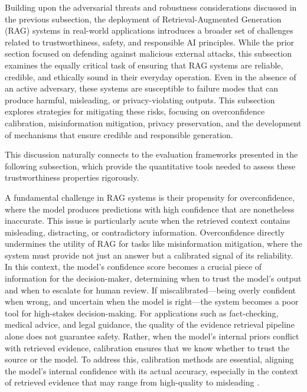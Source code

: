 \documentclass[11pt]{article}
\begin{document}
Building upon the adversarial threats and robustness considerations discussed in the previous subsection, the deployment of Retrieval-Augmented Generation (RAG) systems in real-world applications introduces a broader set of challenges related to trustworthiness, safety, and responsible AI principles. While the prior section focused on defending against malicious external attacks, this subsection examines the equally critical task of ensuring that RAG systems are reliable, credible, and ethically sound in their everyday operation. Even in the absence of an active adversary, these systems are susceptible to failure modes that can produce harmful, misleading, or privacy-violating outputs. This subsection explores strategies for mitigating these risks, focusing on overconfidence calibration, misinformation mitigation, privacy preservation, and the development of mechanisms that ensure credible and responsible generation.

This discussion naturally connects to the evaluation frameworks presented in the following subsection, which provide the quantitative tools needed to assess these trustworthiness properties rigorously.

A fundamental challenge in RAG systems is their propensity for overconfidence, where the model produces predictions with high confidence that are nonetheless inaccurate. This issue is particularly acute when the retrieved context contains misleading, distracting, or contradictory information. Overconfidence directly undermines the utility of RAG for tasks like misinformation mitigation, where the system must provide not just an answer but a calibrated signal of its reliability. In this context, the model's confidence score becomes a crucial piece of information for the decision-maker, determining when to trust the model's output and when to escalate for human review. If miscalibrated---being overly confident when wrong, and uncertain when the model is right---the system becomes a poor tool for high-stakes decision-making. For applications such as fact-checking, medical advice, and legal guidance, the quality of the evidence retrieval pipeline alone does not guarantee safety. Rather, when the model's internal priors conflict with retrieved evidence, calibration ensures that we know whether to trust the source or the model. To address this, calibration methods are essential, aligning the model's internal confidence with its actual accuracy, especially in the context of retrieved evidence that may range from high-quality to misleading \cite{ref162}.
\end{document}
